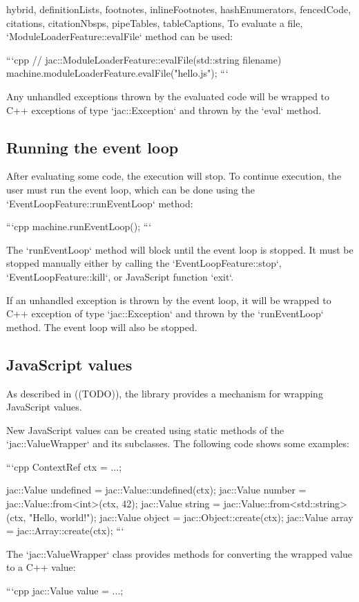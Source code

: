 \documentclass[
  digital,
  oneside,
  nosansbold,
  nocolorbold,
  lof,
  lot
]{fithesis4}
\begin{document}
\begin{markdown*}{%
  hybrid,
  definitionLists,
  footnotes,
  inlineFootnotes,
  hashEnumerators,
  fencedCode,
  citations,
  citationNbsps,
  pipeTables,
  tableCaptions,
}
To evaluate a file, `ModuleLoaderFeature::evalFile` method can be used:

```cpp
// jac::ModuleLoaderFeature::evalFile(std::string filename)
machine.moduleLoaderFeature.evalFile("hello.js");
```

Any unhandled exceptions thrown by the evaluated code will be wrapped to C++ exceptions of type `jac::Exception` and thrown by the `eval` method.

\subsection{Running the event loop}

After evaluating some code, the execution will stop. To continue execution, the user must run the event loop, which can be done using the `EventLoopFeature::runEventLoop` method:

```cpp
machine.runEventLoop();
```

The `runEventLoop` method will block until the event loop is stopped. It must be stopped manually either by calling the `EventLoopFeature::stop`, `EventLoopFeature::kill`, or JavaScript function `exit`.

If an unhandled exception is thrown by the event loop, it will be wrapped to C++ exception of type `jac::Exception` and thrown by the `runEventLoop` method. The event loop will also be stopped.

\subsection{JavaScript values}

As described in ((TODO)), the library provides a mechanism for wrapping JavaScript values.

New JavaScript values can be created using static methods of the `jac::ValueWrapper` and its subclasses. The following code shows some examples:

```cpp
ContextRef ctx = ...;

jac::Value undefined = jac::Value::undefined(ctx);
jac::Value number = jac::Value::from<int>(ctx, 42);
jac::Value string = jac::Value::from<std::string>(ctx, "Hello, world!");
jac::Value object = jac::Object::create(ctx);
jac::Value array = jac::Array::create(ctx);
```

The `jac::ValueWrapper` class provides methods for converting the wrapped value to a C++ value:

```cpp
jac::Value value = ...;


\end{markdown*}
\end{document}
